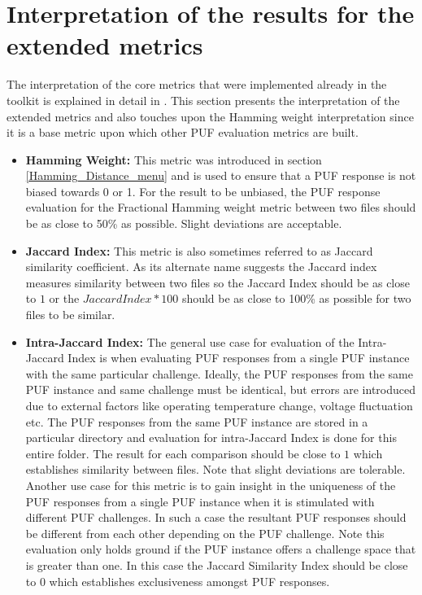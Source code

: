 \section{Interpretation of the results for the extended metrics}
The interpretation of the core metrics that were implemented already in the toolkit is explained in detail in \cite{71}. This section presents the interpretation of the extended metrics and also touches upon the Hamming weight interpretation since it is a base metric upon which other PUF evaluation metrics are built.
\begin{itemize}
	\item \textbf{Hamming Weight:} This metric was introduced in section \ref{Hamming_Distance_menu} and is used to ensure that a PUF response is not biased towards 0 or 1. For the result to be unbiased, the PUF response evaluation for the Fractional Hamming weight metric between two files should be as close to 50\% as possible. Slight deviations are acceptable.
	\item \textbf{Jaccard Index:} This metric is also sometimes referred to as Jaccard similarity coefficient. As its alternate name suggests the Jaccard index measures similarity between two files so the Jaccard Index should be as close to $1$ or the $Jaccard Index * 100$ should be as close to 100\% as possible for two files to be similar.
	\item \textbf{Intra-Jaccard Index:} The general use case for evaluation of the Intra-Jaccard Index is when evaluating PUF responses from a single PUF instance with the same particular challenge. Ideally, the PUF responses from the same PUF instance and same challenge must be identical, but errors are introduced due to external factors like operating temperature change, voltage fluctuation etc. The PUF responses from the same PUF instance are stored in a particular directory and evaluation
		for intra-Jaccard Index is done for this entire folder. The result for each comparison should be close to $1$ which establishes similarity between files. Note that slight deviations are tolerable. Another use case for this metric is to gain insight in the uniqueness of the PUF responses from a single PUF instance when
		it is stimulated with different PUF challenges. In such a case the resultant PUF responses should be different from each other depending on the PUF challenge. Note this evaluation only holds ground if the PUF instance offers a challenge space that is greater than one. In this case the Jaccard Similarity Index should be close to $0$ which establishes exclusiveness amongst PUF responses.

\end{itemize}
